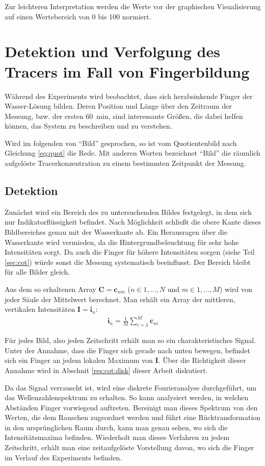 Zur leichteren Interpretation werden die Werte vor der graphischen Visualisierung auf einen Wertebereich von 0 bis 100 normiert.

\section{Detektion und Verfolgung des Tracers im Fall von Fingerbildung}
\label{sec:track}
Während des \COTm Experiments wird beobachtet, dass sich herabsinkende Finger der Wasser-\COTm Lösung bilden. Deren Position und Länge über den Zeitraum der Messung, bzw. der ersten \SI{60}{\minute}, sind interessante Größen, die dabei helfen können, das System zu beschreiben und zu verstehen.

Wird im folgenden von ``Bild'' gesprochen, so ist vom Quotientenbild nach Gleichung \ref{eq:quot} die Rede. Mit anderen Worten bezeichnet ``Bild'' die räumlich aufgelöste Tracerkonzentration zu einem bestimmten Zeitpunkt der Messung.

\subsection{Detektion}
\label{sec:dec}
Zunächst wird ein Bereich des zu untersuchenden Bildes festgelegt, in dem sich nur Indikatorflüssigkeit befindet. Nach Möglichkeit schließt die obere Kante dieses Bildbereiches genau mit der Wasserkante ab. Ein Herausragen über die Wasserkante wird vermieden, da die Hintergrundbeleuchtung für sehr hohe Intensitäten sorgt. Da auch die Finger für höhere Intensitäten sorgen (siehe Teil \ref{sec:cot}) würde sonst die Messung systematisch beeinflusst. Der Bereich bleibt für alle Bilder gleich.

Aus dem so erhaltenen Array $\mathbf{C} = \mathbf{c}_{nm}$ ($n \in 1,\dots,N$ und $m \in 1,\dots,M$) wird von jeder Säule der Mittelwert berechnet. Man erhält ein Array der mittleren, vertikalen Intensitäten $\mathbf{I} = \mathbf{i}_{n}$:
\begin{eqnarray}
 \mathbf{i}_{n} = \frac{1}{M} \sum_{i=1}^{M} \mathbf{c}_{ni}
\end{eqnarray}

Für jedes Bild, also jeden Zeitschritt erhält man so ein charakteristisches Signal. Unter der Annahme, dass die Finger sich gerade nach unten bewegen, befindet sich ein Finger an jedem lokalen Maximum von $\mathbf{I}$. Über die Richtigkeit dieser Annahme wird in Abschnit \ref{res:cot:disk} dieser Arbeit diskutiert. 

Da das Signal verrauscht ist, wird eine diskrete Fourieranalyse durchgeführt, um das Wellenzahlenspektrum zu erhalten. So kann analysiert werden, in welchen Abständen Finger vorwiegend auftreten. Bereinigt man dieses Spektrum von den Werten, die dem Rauschen zugeordnet werden und führt eine Rücktransformation in den ursprünglichen Raum durch, kann man genau sehen, wo sich die Intensitätsmaxima befinden. Wiederholt man dieses Verfahren zu jedem Zeitschritt, erhält man eine zeitaufgelöste Vorstellung davon, wo sich die Finger im Verlauf des Experiments befinden.

